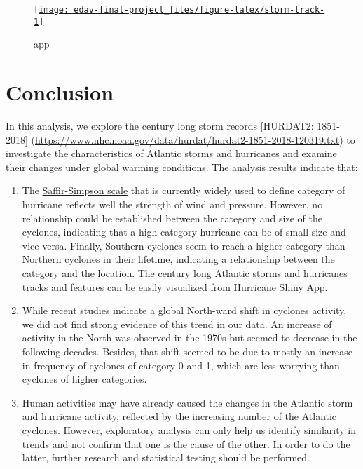 \documentclass[]{book}
\begin{document}
\begin{figure}

{\centering \href{https://hurricane.shinyapps.io/01_01/}{\texttt{[image: edav-final-project\_files/figure-latex/storm-track-1]} }

}

\caption{app}\label{fig:storm-track}
\end{figure}

\hypertarget{conclusion}{%
\chapter{Conclusion}\label{conclusion}}

In this analysis, we explore the century long storm records {[}HURDAT2: 1851-2018{]} (\url{https://www.nhc.noaa.gov/data/hurdat/hurdat2-1851-2018-120319.txt}) to investigate the characteristics of Atlantic storms and hurricanes and examine their changes under global warming conditions. The analysis results indicate that:

\begin{enumerate}
\def\labelenumi{(\arabic{enumi})}
\item
  The \href{https://www.nhc.noaa.gov/aboutsshws.php}{Saffir-Simpson scale} that is currently widely used to define category of hurricane reflects well the strength of wind and pressure. However, no relationship could be established between the category and size of the cyclones, indicating that a high category hurricane can be of small size and vice versa. Finally, Southern cyclones seem to reach a higher category than Northern cyclones in their lifetime, indicating a relationship between the category and the location. The century long Atlantic storms and hurricanes tracks and features can be easily visualized from \href{https://hurricane.shinyapps.io/01_01/}{Hurricane Shiny App}.
\item
  While recent studies indicate a global North-ward shift in cyclones activity, we did not find strong evidence of this trend in our data. An increase of activity in the North was observed in the 1970s but seemed to decrease in the following decades. Besides, that shift seemed to be due to mostly an increase in frequency of cyclones of category 0 and 1, which are less worrying than cyclones of higher categories.
\item
  Human activities may have already caused the changes in the Atlantic storm and hurricane activity, reflected by the increasing number of the Atlantic cyclones. However, exploratory analysis can only help us identify similarity in trends and not confirm that one is the cause of the other. In order to do the latter, further research and statistical testing should be performed.
\end{enumerate}


\end{document}
